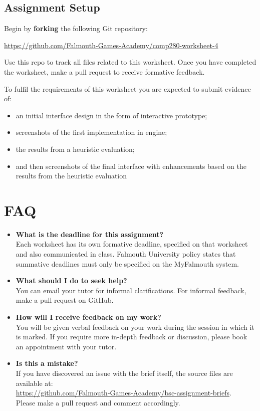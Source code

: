 \documentclass{../../../fal_assignment}
\begin{document}
\subsection*{Assignment Setup} 

Begin by \textbf{forking} the following Git repository: 

\hyperlink{https://github.com/Falmouth-Games-Academy/comp280-worksheet-4}{https://github.com/Falmouth-Games-Academy/comp280-worksheet-4} 

Use this repo to track all files related to this worksheet. Once you have completed the worksheet, make a pull request to receive formative feedback. 

To fulfil the requirements of this worksheet you are expected to submit evidence of:

\begin{itemize}
	\item an initial interface design in the form of interactive prototype;
	\item screenshots of the first implementation in engine;
	\item the results from a heuristic evaluation;
	\item and then screenshots of the final interface with enhancements based on the results from the heuristic evaluation
\end{itemize}


\section*{FAQ}

\begin{itemize}
	\item 	\textbf{What is the deadline for this assignment?} \\ 
			Each worksheet has its own formative deadline, specified on that worksheet and also communicated in class.
    		Falmouth University policy states that summative deadlines must only be specified on the MyFalmouth system.
    		
	\item 	\textbf{What should I do to seek help?} \\ 
    		You can email your tutor for informal clarifications. For informal feedback, make a pull request on GitHub. 
    		
	\item 	\textbf{How will I receive feedback on my work?} \\ 
    		You will be given verbal feedback on your work during the session in which it is marked.
    		If you require more in-depth feedback or discussion, please book an appointment with your tutor.
    		
    	\item 	\textbf{Is this a mistake?} \\ 	
    		If you have discovered an issue with the brief itself, the source files are available at: \\
    		\url{https://github.com/Falmouth-Games-Academy/bsc-assignment-briefs}.\\
    		 Please make a pull request and comment accordingly.
\end{itemize}
\end{document}
